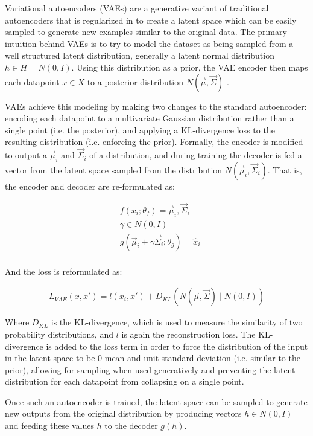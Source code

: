 Variational autoencoders (VAEs) are a generative variant of
traditional autoencoders that is regularized in to create a latent
space which can be easily sampled to generate new examples similar to
the original data. The primary intuition behind VAEs is to try to
model the dataset as being sampled from a well structured latent
distribution, generally a latent normal distribution $h \in H =
N(0,I)$. Using this distribution as a prior, the VAE encoder then
maps each datapoint $x \in X$ to a posterior distribution
$N(\vec{\mu}, \vec{\Sigma})$ \cite{doersch2016tutorial}.

VAEs achieve this modeling by making two changes to the standard
autoencoder: encoding each datapoint to a multivariate Gaussian
distribution rather than a single point (i.e. the posterior), and
applying a KL-divergence loss to the resulting distribution (i.e.
enforcing the prior). Formally, the encoder is modified to output a
$\vec{\mu}_i$ and $\vec{\Sigma}_i$ of a distribution, and during
training the decoder is fed a vector from the latent space sampled
from the distribution $N(\vec{\mu}_i, \vec{\Sigma}_i)$. That is, the
encoder and decoder are re-formulated as:

\begin{align*}
    &f(x_i ;\theta_f) = \vec{\mu}_i, \vec{\Sigma}_i \\
    &\gamma \in N(0,I) \\
    &g(\vec{\mu}_i + \gamma \vec{\Sigma}_i; \theta_g) = \hat{x}_i \\
\end{align*}

And the loss is reformulated as:

\begin{align*}
    L_{VAE}(x, x') = l(x_i, x') + D_{KL}(N(\vec{\mu}, \vec{\Sigma}) \mid N(0,I))
\end{align*}

Where $D_{KL}$ is the KL-divergence, which is used to measure the
similarity of two probability distributions, and $l$ is again the
reconstruction loss. The KL-divergence is added to the loss term in
order to force the distribution of the input in the latent space to
be $0$-mean and unit standard deviation (i.e. similar to the prior),
allowing for sampling when used generatively and preventing the
latent distribution for each datapoint from collapsing on a single
point.

Once such an autoencoder is trained, the latent space can be sampled
to generate new outputs from the original distribution by producing
vectors $h \in N(0,I)$ and feeding these values $h$ to the decoder
$g(h)$.

